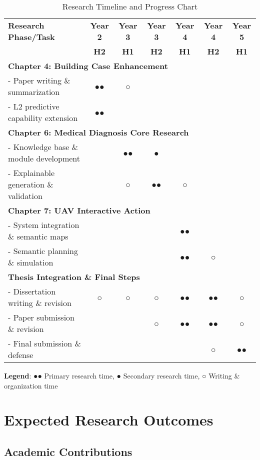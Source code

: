 \begin{table}[H]
\centering
\caption{Research Timeline and Progress Chart}
\label{tab:gantt-chart}
\begin{tabular}{|l|c|c|c|c|c|c|}
\hline
\textbf{Research Phase/Task} & \textbf{Year 2} & \textbf{Year 3} & \textbf{Year 3} & \textbf{Year 4} & \textbf{Year 4} & \textbf{Year 5} \\
 & \textbf{H2} & \textbf{H1} & \textbf{H2} & \textbf{H1} & \textbf{H2} & \textbf{H1} \\
\hline
\multicolumn{7}{|l|}{\textbf{Chapter 4: Building Case Enhancement}} \\
\hline
- Paper writing \& summarization & ●● & ○ &  &  &  &  \\
\hline
- L2 predictive capability extension & ●● &  &  &  &  &  \\
\hline
\multicolumn{7}{|l|}{\textbf{Chapter 6: Medical Diagnosis Core Research}} \\
\hline
- Knowledge base \& module development &  & ●● & ● &  &  &  \\
\hline
- Explainable generation \& validation &  & ○ & ●● & ○ &  &  \\
\hline
\multicolumn{7}{|l|}{\textbf{Chapter 7: UAV Interactive Action}} \\
\hline
- System integration \& semantic maps &  &  &  & ●● &  &  \\
\hline
- Semantic planning \& simulation &  &  &  & ●● & ○ &  \\
\hline
\multicolumn{7}{|l|}{\textbf{Thesis Integration \& Final Steps}} \\
\hline
- Dissertation writing \& revision & ○ & ○ & ○ & ●● & ●● & ○ \\
\hline
- Paper submission \& revision &  &  & ○ & ●● & ●● & ○ \\
\hline
- Final submission \& defense &  &  &  &  & ○ & ●● \\
\hline
\end{tabular}
\end{table}

\textbf{Legend}: ●● Primary research time, ● Secondary research time, ○ Writing \& organization time

\section{Expected Research Outcomes}

\subsection{Academic Contributions}

